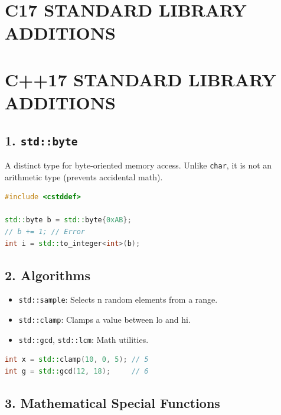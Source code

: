 \hypertarget{c17-standard-library-additions}{%
\chapter{C17 STANDARD LIBRARY
ADDITIONS}\label{c17-standard-library-additions}}

\hypertarget{c17-standard-library-additions-1}{%
\chapter{C++17 STANDARD LIBRARY
ADDITIONS}\label{c17-standard-library-additions-1}}

\hypertarget{stdbyte}{%
\section{\texorpdfstring{1.
\texttt{std::byte}}{1. std::byte}}\label{stdbyte}}

A distinct type for byte-oriented memory access. Unlike
\passthrough{\lstinline!char!}, it is not an arithmetic type (prevents
accidental math).

\begin{lstlisting}[language={C++}]
#include <cstddef>

std::byte b = std::byte{0xAB};
// b += 1; // Error
int i = std::to_integer<int>(b);
\end{lstlisting}

\hypertarget{algorithms}{%
\section{2. Algorithms}\label{algorithms}}

\begin{itemize}
\tightlist
\item
  \passthrough{\lstinline!std::sample!}: Selects n random elements from
  a range.
\item
  \passthrough{\lstinline!std::clamp!}: Clamps a value between lo and
  hi.
\item
  \passthrough{\lstinline!std::gcd!},
  \passthrough{\lstinline!std::lcm!}: Math utilities.
\end{itemize}

\begin{lstlisting}[language={C++}]
int x = std::clamp(10, 0, 5); // 5
int g = std::gcd(12, 18);     // 6
\end{lstlisting}

\hypertarget{mathematical-special-functions}{%
\section{3. Mathematical Special
Functions}\label{mathematical-special-functions}}

